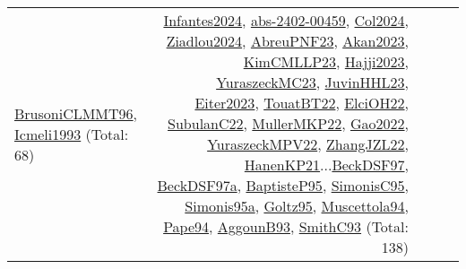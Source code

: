 {\begin{longtable}{p{3cm}r>{\raggedright\arraybackslash}p{6cm}>{\raggedright\arraybackslash}p{6cm}>{\raggedright\arraybackslash}p{8cm}}
\hyperref[detail:BrusoniCLMMT96]{BrusoniCLMMT96}, \hyperref[detail:Icmeli1993]{Icmeli1993} (Total: 68) & \hyperref[detail:Infantes2024]{Infantes2024}, \hyperref[detail:abs-2402-00459]{abs-2402-00459}, \hyperref[detail:Col2024]{Col2024}, \hyperref[detail:Ziadlou2024]{Ziadlou2024}, \hyperref[detail:AbreuPNF23]{AbreuPNF23}, \hyperref[detail:Akan2023]{Akan2023}, \hyperref[detail:KimCMLLP23]{KimCMLLP23}, \hyperref[detail:Hajji2023]{Hajji2023}, \hyperref[detail:YuraszeckMC23]{YuraszeckMC23}, \hyperref[detail:JuvinHHL23]{JuvinHHL23}, \hyperref[detail:Eiter2023]{Eiter2023}, \hyperref[detail:TouatBT22]{TouatBT22}, \hyperref[detail:ElciOH22]{ElciOH22}, \hyperref[detail:SubulanC22]{SubulanC22}, \hyperref[detail:MullerMKP22]{MullerMKP22}, \hyperref[detail:Gao2022]{Gao2022}, \hyperref[detail:YuraszeckMPV22]{YuraszeckMPV22}, \hyperref[detail:ZhangJZL22]{ZhangJZL22}, \hyperref[detail:HanenKP21]{HanenKP21}...\hyperref[detail:BeckDSF97]{BeckDSF97}, \hyperref[detail:BeckDSF97a]{BeckDSF97a}, \hyperref[detail:BaptisteP95]{BaptisteP95}, \hyperref[detail:SimonisC95]{SimonisC95}, \hyperref[detail:Simonis95a]{Simonis95a}, \hyperref[detail:Goltz95]{Goltz95}, \hyperref[detail:Muscettola94]{Muscettola94}, \hyperref[detail:Pape94]{Pape94}, \hyperref[detail:AggounB93]{AggounB93}, \hyperref[detail:SmithC93]{SmithC93} (Total: 138)\\

\end{longtable}}
